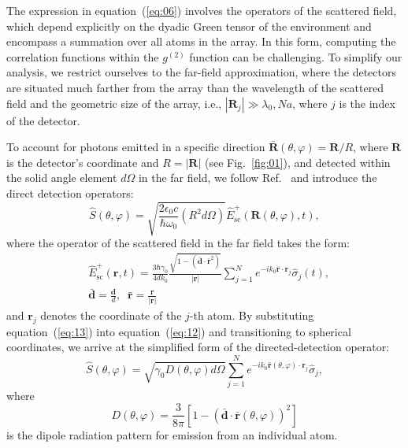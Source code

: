 \documentclass[aps,prl,twocolumn,superscriptaddress,showpacs,amsmath,amssymb]{revtex4-2}
\begin{document}
The expression in equation~(\ref{eq:06}) involves the operators of the scattered field, which depend explicitly on the dyadic Green tensor of the environment and encompass a summation over all atoms in the array. In this form, computing the correlation functions within the $g^{(2)}$ function can be challenging. To simplify our analysis, we restrict ourselves to the far-field approximation, where the detectors are situated much farther from the array than the wavelength of the scattered field and the geometric size of the array, i.e., $ |\mathbf{R}_j| \gg \lambda_0, N a$, where $j$ is the index of the detector.

To account for photons emitted in a specific direction $\bar{\mathbf{R}}(\theta, \varphi) = \mathbf{R} / R$, where $\mathbf{R}$ is the detector's coordinate and $R = |\mathbf{R}|$ (see Fig.~\ref{fig:01}), and detected within the solid angle element $d \Omega$ in the far field, we follow Ref.~\cite{carmichael2000quantum} and introduce the direct detection operators:
\begin{equation}
    \hat{S}(\theta, \varphi) = \sqrt{\frac{2 \epsilon_0 c}{\hbar \omega_0} \left( R^2 d \Omega \right)} \hat{E}_\mathrm{sc}^+ (\mathbf{R}(\theta, \varphi), t),
    \label{eq:12}
\end{equation}
where the operator of the scattered field in the far field takes the form:
\begin{align}
    \label{eq:13}
    &\hat{E}_\mathrm{sc}^+ (\mathbf{r}, t) = \frac{3 \hbar \gamma_0}{4 d k_0} \frac{\sqrt{1 - \left( \bar{\mathbf{d}} \cdot \bar{\mathbf{r}}^2 \right)}}{|\mathbf{r}|} \sum_{j=1}^N e^{-i k_0 \bar{\mathbf{r}} \cdot \mathbf{r}_j} \hat{\sigma}_j(t), \\
    & \bar{\mathbf{d}} = \frac{\mathbf{d}}{d}, \;\; \bar{\mathbf{r}} = \frac{\mathbf{r}}{|\mathbf{r}|} \nonumber
\end{align}
and $\mathbf{r}_j$ denotes the coordinate of the $j$-th atom. By substituting equation~(\ref{eq:13}) into equation~(\ref{eq:12}) and transitioning to spherical coordinates, we arrive at the simplified form of the directed-detection operator:
\begin{equation}
    \hat{S}(\theta, \varphi) = \sqrt{\gamma_0 D(\theta, \varphi) d \Omega} \sum_{j=1}^N e^{-i k_0 \bar{\mathbf{r}}(\theta, \varphi) \cdot \mathbf{r}_j} \hat{\sigma}_j,
    \label{eq:14}
\end{equation}
where 
\begin{equation}
    D(\theta, \varphi) = \frac{3}{8 \pi} \left[ 1 - \left( \bar{\mathbf{d}} \cdot \bar{\mathbf{r}}(\theta, \varphi) \right)^2 \right]
    \label{eq:15}
\end{equation}
is the dipole radiation pattern for emission from an individual atom.
\end{document}
